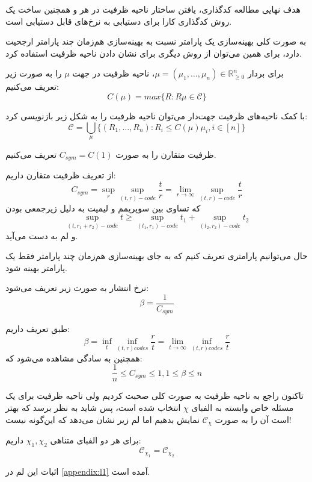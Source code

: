 	هدف نهایی مطالعه کدگذاری، یافتن ساختار ناحیه ظرفیت در هر \icod و همچنین ساخت یک روش کدگذاری کارا برای دستیابی به نرخ‌های قابل دستیابی است.
	
	به صورت کلی بهینه‌سازی یک پارامتر نسبت به بهینه‌سازی هم‌زمان چند پارامتر ارجحیت دارد، برای همین می‌توان از روش دیگری برای نشان دادن ناحیه ظرفیت استفاده کرد.
	\begin{definition}
	برای بردار
	$\mu = (\mu_1, \ldots, \mu_n) \in \mathbb{R}_{\geqslant 0}^n $،
    ناحیه ظرفیت در جهت
	$\mu$
	را به صورت زیر تعریف می‌کنیم:
	$$C(\mu) = max \{R: R \mu \in \mathscr{C}\}$$
\end{definition}

\begin{remark}
	با کمک ناحیه‌های ظرفیت جهت‌دار می‌توان ناحیه ظرفیت را به شکل زیر بازنویسی کرد:
	$$\mathscr{C} = \bigcup\limits_{\mu} \{(R_1, \ldots, R_n): R_i \leq C(\mu) \mu_i, i \in [n]\}$$
	\begin{definition}
	ظرفیت متقارن را به صورت
	$C_{sym} = C(1) $
	 تعریف می‌کنیم.
	 \end{definition}
\end{remark}

از تعریف ظرفیت متقارن داریم:
$$C_{sym}= \sup\limits_{r} \sup_{(t, r)-code} \dfrac{t}{r} = \lim\limits_{r \rightarrow \infty} \sup_{(t, r)-code} \dfrac{t}{r} $$
که تساوی بین سوپریمم و لیمیت به دلیل زیرجمعی بودن
$$\sup_{(t, r_1 + r_2)-code} t \geqslant \sup_{(t_1, r_1)-code} t_1 + \sup_{(t_2, r_2)-code} t_2$$
و لم
به دست می‌آید.

حال می‌توانیم پارامتری تعریف کنیم که به جای بهینه‌سازی هم‌زمان چند پارامتر فقط یک پارامتر بهینه شود.
\begin{definition}
	نرخ انتشار به صورت زیر تعریف می‌شود:
	$$\beta = \dfrac{1}{C_{sym}}$$
\end{definition}
\begin{remark}
طبق تعریف داریم:
$$\beta = \inf\limits_{t} \inf\limits_{(t, r) codes} \dfrac{r}{t} = \lim\limits_{t \rightarrow \infty} \inf\limits_{(t, r) codes} \dfrac{r}{t}$$
همچنین به سادگی مشاهده می‌شود که:
	$$\dfrac{1}{n} \leq C_{sym} \leq 1, 1 \leq \beta \leq n$$
\end{remark}
تاکنون راجع به ناحیه ظرفیت به صورت کلی صحبت کردیم ولی ناحیه ظرفیت برای یک مسئله خاص وابسته به الفبای
$\chi$
انتخاب شده است، پس شاید به نظر برسد که بهتر است آن را به صورت
$\mathscr{C}_\chi$
نمایش بدهیم اما لم زیر نشان می‌دهد که این‌گونه نیست!
\begin{lemma}
	برای هر دو الفبای متناهی
	$\chi_1, \chi_2$
	داریم:
	$$\mathscr{C}_{\chi_1 }= \mathscr{C}_{\chi_2} $$
\end{lemma}
اثبات این لم در
\autoref{appendix:l1}
 آمده است.


